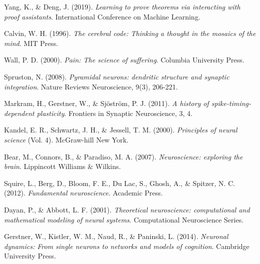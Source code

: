 \documentclass[12pt]{article}
\begin{document}
\begin{thebibliography}{20}
Yang, K., \& Deng, J. (2019).
\textit{Learning to prove theorems via interacting with proof assistants}.
International Conference on Machine Learning.

Calvin, W. H. (1996).
\textit{The cerebral code: Thinking a thought in the mosaics of the mind}.
MIT Press.

Wall, P. D. (2000).
\textit{Pain: The science of suffering}.
Columbia University Press.

Spruston, N. (2008).
\textit{Pyramidal neurons: dendritic structure and synaptic integration}.
Nature Reviews Neuroscience, 9(3), 206-221.

Markram, H., Gerstner, W., \& Sjöström, P. J. (2011).
\textit{A history of spike-timing-dependent plasticity}.
Frontiers in Synaptic Neuroscience, 3, 4.

Kandel, E. R., Schwartz, J. H., \& Jessell, T. M. (2000).
\textit{Principles of neural science} (Vol. 4).
McGraw-hill New York.

Bear, M., Connors, B., \& Paradiso, M. A. (2007).
\textit{Neuroscience: exploring the brain}.
Lippincott Williams \& Wilkins.

Squire, L., Berg, D., Bloom, F. E., Du Lac, S., Ghosh, A., \& Spitzer, N. C. (2012).
\textit{Fundamental neuroscience}.
Academic Press.

Dayan, P., \& Abbott, L. F. (2001).
\textit{Theoretical neuroscience: computational and mathematical modeling of neural systems}.
Computational Neuroscience Series.

Gerstner, W., Kistler, W. M., Naud, R., \& Paninski, L. (2014).
\textit{Neuronal dynamics: From single neurons to networks and models of cognition}.
Cambridge University Press.

\end{thebibliography}
\end{document}
